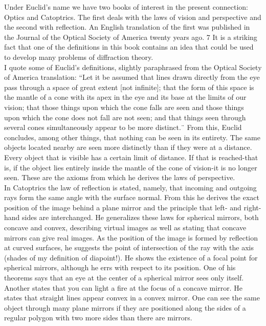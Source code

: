             Under Euclid's name we have two books of interest in the present connection: Optics and Catoptrics. The first deals with the laws of vision and perspective and the second with reflection. An English translation of the first was published in the Journal of the Optical Society of America twenty years ago. 7 It is a striking fact that one of the definitions in this book contains an idea that could be used to develop many problems of diffraction theory.\\

            I quote some of Euclid's definitions, slightly paraphrased from the Optical Society of America translation: ``Let it be assumed that lines drawn directly from the eye pass through a space of great extent [not infinite]; that the form of this space is the mantle of a cone with its apex in the eye and its base at the limits of our vision; that those things upon which the cone falls are seen and those things upon which the cone does not fall are not seen; and that things seen through several cones simultaneously appear to be more distinct.¨ From this, Euclid concludes, among other things, that nothing can be seen in its entirety. The same objects located nearby are seen more distinctly than if they were at a distance. Every object that is visible has a certain limit of distance. If that is reached-that is, if the object lies entirely inside the mantle of the cone of vision-it is no longer seen. These are the axioms from which he derives the laws of perspective.\\

            In Catoptrics the law of reflection is stated, namely, that incoming and outgoing rays form the same angle with the surface normal. From this he derives the exact position of the image behind a plane mirror and the principle that left- and right-hand sides are interchanged. He generalizes these laws for spherical mirrors, both concave and convex, describing virtual images as well as stating that concave mirrors can give real images. As the position of the image is formed by reflection at curved surfaces, he suggests the point of intersection of the ray with the axis (shades of my definition of diapoint!). He shows the existence of a focal point for spherical mirrors, although he errs with respect to its position. One of his theorems says that an eye at the center of a spherical mirror sees only itself. Another states that you can light a fire at the focus of a concave mirror. He states that straight lines appear convex in a convex mirror. One can see the same object through many plane mirrors if they are positioned along the sides of a regular polygon with two more sides than there are mirrors.\\

